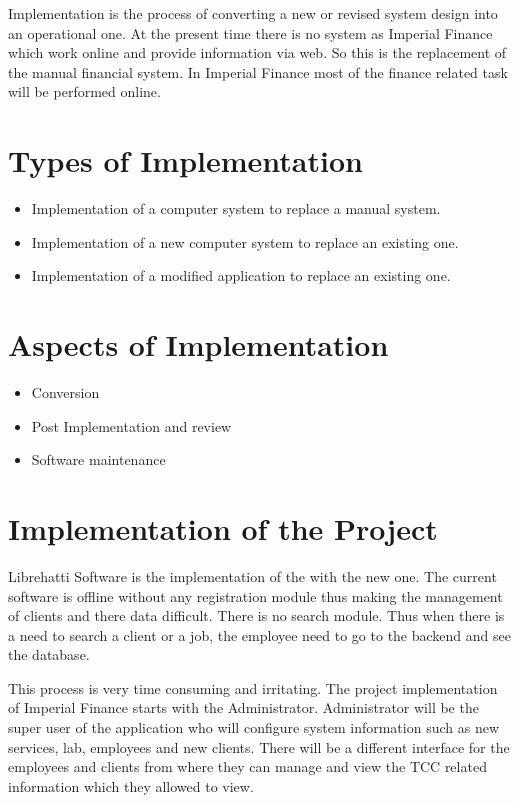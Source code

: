 Implementation is the process of converting a new or revised system 
design into an operational one. At the present time there is no system 
as Imperial Finance which work online and provide information via web.
So this is the replacement of the manual financial system. In Imperial 
Finance most of the finance related task will be performed online.

\section{Types of Implementation}
\begin{itemize}
\item Implementation of a computer system to replace a manual system.
\item Implementation of a new computer system to replace an existing one.
\item Implementation of a modified application to replace an existing one.
\end{itemize}

\section{Aspects of Implementation}
\begin{itemize}
\item Conversion
\item Post Implementation and review
\item Software maintenance
\end{itemize}
\vskip 0.5cm
\section{Implementation of the Project}
Librehatti Software is the implementation of the with the new 
one. The current software is offline without any registration module 
thus making the management of clients and there data difficult. There 
is no search module. Thus when there is a need to search a client or a 
job, the employee need to go to the backend and see the database. 

This process is very time consuming and irritating. The project 
implementation of Imperial Finance starts with the Administrator. 
Administrator will be the super user of the application who will 
configure system information such as new services, lab, employees and 
new clients. There will be a different interface for the employees and 
clients from where they can manage and view the TCC related information 
which they allowed to view.

